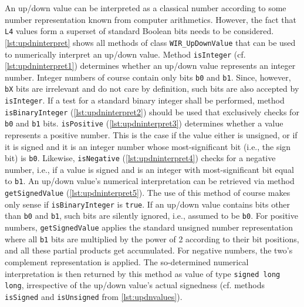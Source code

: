 An up/down value can be interpreted as a classical number according to some number representation known from computer arithmetics.
However, the fact that \texttt{L4} values form a superset of standard Boolean bits needs to be considered.
\cref{lst:updninterpret} shows all methods of class \texttt{WIR\_UpDownValue} that can be used to numerically interpret an up/down value.
Method \texttt{isInteger} (cf. \cref{lst:updninterpret1}) determines whether an up/down value represents an integer number.
Integer numbers of course contain only bits \texttt{b0} and \texttt{b1}.
Since, however, \texttt{bX} bits are irrelevant and do not care by definition, such bits are also accepted by \texttt{isInteger}.
If a test for a standard binary integer shall be performed, method \texttt{isBinaryInteger} (\cref{lst:updninterpret2}) should be used that exclusively checks for \texttt{b0} and \texttt{b1} bits.
\texttt{isPositive} (\cref{lst:updninterpret3}) determines whether a value represents a positive number.
This is the case if the value either is unsigned, or if it is signed and it is an integer number whose most-significant bit (i.e., the sign bit) is \texttt{b0}.
Likewise, \texttt{isNegative} (\cref{lst:updninterpret4}) checks for a negative number, i.e., if a value is signed and is an integer with most-significant bit equal to \texttt{b1}.
An up/down value's numerical interpretation can be retrieved via method \texttt{getSignedValue} (\cref{lst:updninterpret5}).
The use of this method of course makes only sense if \texttt{isBinaryInteger} is \texttt{true}.
If an up/down value contains bits other than \texttt{b0} and \texttt{b1}, such bits are silently ignored, i.e., assumed to be \texttt{b0}.
For positive numbers, \texttt{getSignedValue} applies the standard unsigned number representation where all \texttt{b1} bits are multiplied by the power of 2 according to their bit positions, and all these partial products get accumulated.
For negative numbers, the two's complement representation is applied.
The so-determined numerical interpretation is then returned by this method as value of type \texttt{signed long long}, irrespective of the up/down value's actual signedness (cf. methods \texttt{isSigned} and \texttt{isUnsigned} from \cref{lst:updnvalues}).

